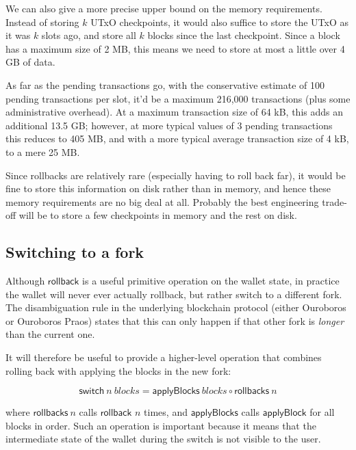 \documentclass{article}
\theoremstyle{definition}{
  \newtheorem{lemma}{Lemma}[section] %
  \newtheorem{definition}[lemma]{Definition}
}
\theoremstyle{theorem}{
  \newtheorem{invariant}[lemma]{Invariant}
  \newtheorem{proofobligation}[lemma]{Proof Obligation}
}
\numberwithin{equation}{lemma}
\begin{document}
We can also give a more precise upper bound on the memory requirements. Instead
of storing $k$ UTxO checkpoints, it would also suffice to store the UTxO as it
was $k$ slots ago, and store all $k$ blocks since the last checkpoint. Since a
block has a maximum size of 2 MB, this means we need to store at most a little
over 4 GB of data.

As far as the pending transactions go, with the conservative estimate of 100
pending transactions per slot, it'd be a maximum 216,000 transactions (plus some
administrative overhead). At a maximum transaction size of 64 kB, this adds an
additional 13.5 GB; however, at more typical values of 3 pending transactions
this reduces to 405 MB, and with a more typical average transaction size of 4
kB, to a mere 25 MB.

Since rollbacks are relatively rare (especially having to roll back far), it
would be fine to store this information on disk rather than in memory, and hence
these memory requirements are no big deal at all. Probably the best engineering
trade-off will be to store a few checkpoints in memory and the rest on disk.


\subsection{Switching to a fork}

Although $\mathsf{rollback}$ is a useful primitive operation on the wallet
state, in practice the wallet will never ever actually rollback, but rather
switch to a different fork. The disambiguation rule in the underlying blockchain
protocol (either Ouroboros or Ouroboros Praos) states that this can only happen
if that other fork is \emph{longer} than the current one.

It will therefore be useful to provide a higher-level operation that combines
rolling back with applying the blocks in the new fork:

\begin{equation}
\mathsf{switch} ~ n ~ \mathit{blocks} = \mathsf{applyBlocks} ~ \mathit{blocks} \circ \mathsf{rollbacks} ~ n
\end{equation}

where $\mathsf{rollbacks} ~ n$ calls $\mathsf{rollback}$ $n$ times, and
$\mathsf{applyBlocks}$ calls $\mathsf{applyBlock}$ for all blocks in order.
Such an operation is important because it means that the intermediate state
of the wallet during the switch is not visible to the user.
\end{document}
